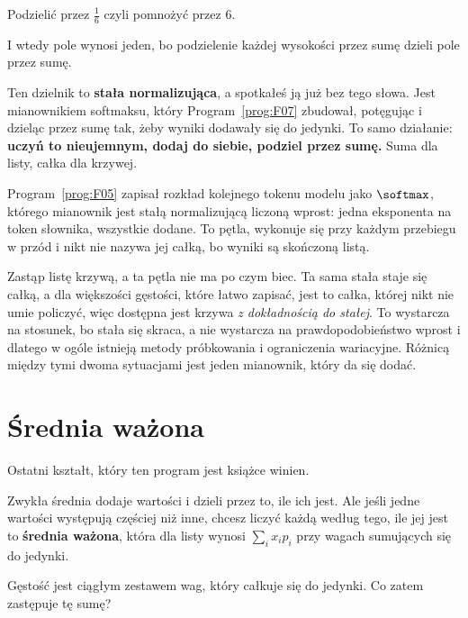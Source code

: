 \begin{fr}
\begin{ansblock}
Podzielić przez $\frac{1}{6}$ \dash{} czyli pomnożyć przez $6$.
\end{ansblock}

I wtedy pole wynosi jeden, bo podzielenie każdej wysokości przez sumę dzieli
pole przez sumę.

Ten dzielnik to \textbf{stała normalizująca}, a spotkałeś ją już bez tego
słowa. Jest mianownikiem softmaksu, który Program~\ref{prog:F07} zbudował,
potęgując i dzieląc przez sumę tak, żeby wyniki dodawały się do jedynki. To
samo działanie: \textbf{uczyń to nieujemnym, dodaj do siebie, podziel przez
sumę.} Suma dla listy, całka dla krzywej.

\begin{aibox}
Program~\ref{prog:F05} zapisał rozkład kolejnego tokenu modelu jako
$\softmax$, którego mianownik jest stałą normalizującą liczoną wprost: jedna
eksponenta na token słownika, wszystkie dodane. To pętla, wykonuje się przy
każdym przebiegu w przód i nikt nie nazywa jej całką, bo wyniki są skończoną
listą.

Zastąp listę krzywą, a ta pętla nie ma po czym biec. Ta sama stała staje się
całką, a dla większości gęstości, które łatwo zapisać, jest to całka, której
nikt nie umie policzyć, więc dostępna jest krzywa \emph{z dokładnością do
stałej}. To wystarcza na stosunek, bo stała się skraca, a nie wystarcza na
prawdopodobieństwo wprost \dash{} i dlatego w ogóle istnieją metody
próbkowania i ograniczenia wariacyjne. Różnicą między tymi dwoma sytuacjami
jest jeden mianownik, który da się dodać.
\end{aibox}
\end{fr}

\section{Średnia ważona}
\label{sec:F13-average}

\begin{fr}
Ostatni kształt, który ten program jest książce winien.

Zwykła średnia dodaje wartości i dzieli przez to, ile ich jest. Ale jeśli
jedne wartości występują częściej niż inne, chcesz liczyć każdą według tego,
ile jej jest \dash{} to \textbf{średnia ważona}, która dla listy wynosi
$\sum_i x_i p_i$ przy wagach sumujących się do jedynki.

Gęstość jest ciągłym zestawem wag, który całkuje się do jedynki. Co zatem
zastępuje tę sumę?
\nextframe
\end{fr}

